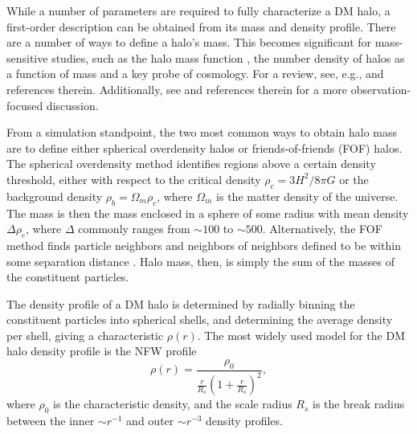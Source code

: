 

While a number of parameters are required to fully characterize a DM halo, a first-order description can be obtained from its mass and density profile.  There are a number of ways to define a halo's mass.  This becomes significant for mass-sensitive studies, such as the halo mass function \citep{1974ApJ...187..425P, 2007MNRAS.374....2R, 2006ApJ...642L..85H, 2007ApJ...671.1160L}, the number density of halos as a function of mass and a key probe of cosmology.  For a review, see, e.g., \citet{2001A&A...367...27W} and references therein.  Additionally, see \citet{2005RvMP...77..207V} and references therein for a more observation-focused discussion.

From a simulation standpoint, the two most common ways to obtain halo mass are to define either spherical overdensity halos or friends-of-friends (FOF) halos.  The spherical overdensity method identifies regions above a certain density threshold, either with respect to the critical density $\rho_{c} = 3 H^{2} / 8 \pi G$ or the background density $\rho_{b} = \Omega_{m} \rho_{c}$, where $\Omega_{m}$ is the matter density of the universe.  The mass is then the mass enclosed in a sphere of some radius with mean density $\Delta \rho_{c}$, where $\Delta$ commonly ranges from $\sim 100$ to $\sim 500$.  Alternatively, the FOF method finds particle neighbors and neighbors of neighbors defined to be within some separation distance \citep{1984MNRAS.206..529E, 1985ApJ...292..371D}.  Halo mass, then, is simply the sum of the masses of the constituent particles.

The density profile of a DM halo is determined by radially binning the constituent particles into spherical shells, and determining the average density per shell, giving a characteristic $\rho(r)$.  The most widely used model for the DM halo density profile is the NFW \citep{1996ApJ...462..563N} profile
\begin{equation} \label{eq:nfw_profile}
	\rho(r) = \frac{ \rho_{0} }{ \frac{ r }{ R_{s}} \left( 1 + \frac{r}{R_{s}} \right)^{2} },
\end{equation}
where $\rho_{0}$ is the characteristic density, and the scale radius $R_{s}$ is the break radius between the inner $\sim r^{-1}$ and outer $\sim r^{-3}$ density profiles.

